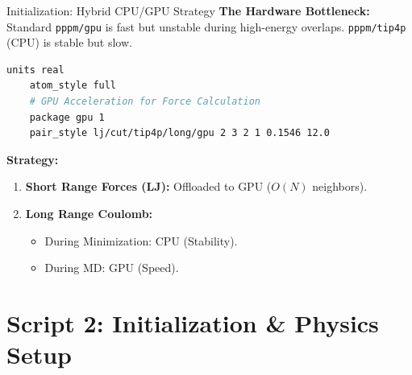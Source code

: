 \documentclass[aspectratio=169, 10pt]{beamer}
\begin{document}
\begin{frame}[fragile]{Initialization: Hybrid CPU/GPU Strategy}
    \textbf{The Hardware Bottleneck:}
    Standard \texttt{pppm/gpu} is fast but unstable during high-energy overlaps. \texttt{pppm/tip4p} (CPU) is stable but slow.
    
    \begin{lstlisting}[language=bash]
    units real
    atom_style full
    # GPU Acceleration for Force Calculation
    package gpu 1
    pair_style lj/cut/tip4p/long/gpu 2 3 2 1 0.1546 12.0
    \end{lstlisting}

    \textbf{Strategy:}
    \begin{enumerate}
        \item \textbf{Short Range Forces (LJ):} Offloaded to GPU ($O(N)$ neighbors).
        \item \textbf{Long Range Coulomb:} 
        \begin{itemize}
            \item During Minimization: CPU (Stability).
            \item During MD: GPU (Speed).
        \end{itemize}
    \end{enumerate}
\end{frame}
\section{Script 2: Initialization \& Physics Setup}
\end{document}
